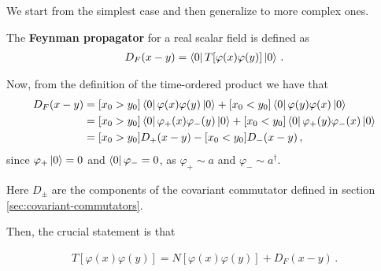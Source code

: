 \documentclass[main.tex]{subfiles}
\begin{document}
We start from the simplest case and then generalize to more complex ones. 

\begin{definition}
The \textbf{Feynman propagator} for a real scalar field is defined as 
%
\begin{align}
D_F (x-y) = \bra{0} T[\varphi (x) \varphi (y)] \ket{0} 
\,.
\end{align}
\end{definition}

Now, from the definition of the time-ordered product we have that 
%
\begin{align}
D_F (x-y) &= 
[x_0 > y_0 ]
\bra{0} \varphi (x) \varphi (y) \ket{0}
+
[x_0 < y_0 ]
\bra{0} \varphi (y) \varphi (x) \ket{0}  \\
&= 
[x_0 > y_0 ]
\bra{0} \varphi_{+} (x) \varphi_{-} (y) \ket{0}
+
[x_0 < y_0 ]
\bra{0} \varphi_{+} (y) \varphi_{-} (x) \ket{0}  \\
&= 
[x_0 > y_0 ]
D_+ (x-y)
-
[x_0 < y_0 ]
D_- (x-y) 
\,,
\end{align}
%
since \(\varphi_{+} \ket{0} = 0\) and \(\bra{0} \varphi_{-} = 0 \), as \(\varphi_{+} \sim a\) and \(\varphi_{-} \sim a ^\dag\).

Here \(D_{\pm}\) are the components of the covariant commutator defined in section \ref{sec:covariant-commutators}. 

Then, the crucial statement is that
\begin{claim}
\begin{align}
T [\varphi (x) \varphi (y)] = N[\varphi (x) \varphi (y)] + D_F (x-y)
\,.
\end{align}
\end{claim}
\end{document}
